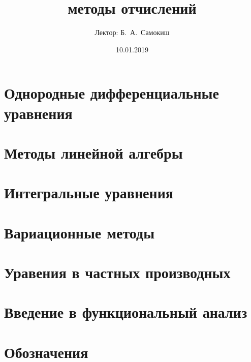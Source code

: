 \documentclass{trlnotes}
\title{методы отчислений}
\date{10.01.2019}
\author{Лектор: Б.~А.~Самокиш}
\begin{document}
 
\maketitle
\tableofcontents
\clearpage

\chapter{Однородные дифференциальные уравнения}
\label{chap:ode}


\chapter{Методы линейной алгебры}


\chapter{Интегральные уравнения}


\chapter{Вариационные методы}


\chapter{Уравения в частных производных}


\clearpage

\appendix
\chapter{Введение в функциональный анализ}


\chapter{Обозначения}
% 

\end{document}
